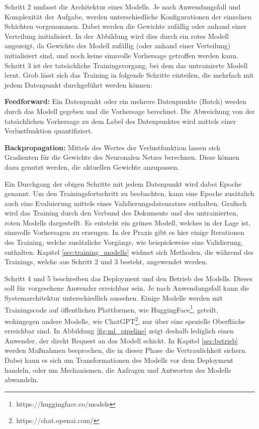 Schritt 2 umfasst die Architektur eines Modells.
Je nach Anwendungsfall und Komplexität der Aufgabe, werden unterschiedliche Konfigurationen der einzelnen Schichten vorgenommen.
Dabei werden die Gewichte zufällig oder anhand einer Verteilung initialisiert.
In der Abbildung wird dies durch ein rotes Modell angezeigt, da Gewichte des Modell zufällig (oder anhand einer Verteilung) initialisiert sind, und noch keine sinnvolle Vorhersage getroffen werden kann.
Schritt 3 ist der tatsächliche Trainingsvorgang, bei dem das untrainierte Modell lernt.
Grob lässt sich das Training in folgende Schritte einteilen, die mehrfach mit jedem Datenpunkt durchgeführt werden können:
\begin{compactenum}
\item \textbf{Feedforward: }Ein Datenpunkt oder ein mehrere Datenpunkte (Batch) werden durch das Modell gegeben und die Vorhersage berechnet. Die Abweichung von der tatsächlichen Vorhersage zu dem Label des Datenpunktes wird mittels einer Verlustfunktion quantifiziert.
\item \textbf{Backpropagation: }Mittels des Wertes der Verlustfunktion lassen sich Gradienten für die Gewichte des Neuronalen Netzes berechnen. Diese können dazu genutzt werden, die aktuellen Gewichte anzupassen. 
\end{compactenum}
Ein Durchgang der obigen Schritte mit jedem Datenpunkt wird dabei Epoche genannt. 
Um den Trainingsfortschritt zu beobachten, kann eine Epoche zusätzlich auch eine Evaluierung mittels eines Validierungsdatensatzes enthalten.
Grafisch wird das Training durch den Verbund des Dokuments und des untrainierten, roten Modells dargestellt. 
Es entsteht ein grünes Modell, welches in der Lage ist, sinnvolle Vorhersagen zu erzeugen.
In der Praxis gibt es hier einige Iterationen des Training, welche zusätzliche Vorgänge, wie beispielsweise eine Validierung, enthalten. 
Kapitel \ref{sec:training_modells} widmet sich Methoden, die während des Trainings, welche aus Schritt 2 und 3 besteht, angewendet werden.

Schritt 4 und 5 beschreiben das Deployment und den Betrieb des Modells. 
Dieses soll für vorgesehene Anwender erreichbar sein. 
Je nach Anwendungsfall kann die Systemarchitektur unterschiedlich aussehen. 
Einige Modelle werden mit Trainingscode auf öffentlichen Plattformen, wie HuggingFace\footnote{https://huggingface.co/models}, geteilt, wohingegen andere Modelle, wie ChatGPT\footnote{https://chat.openai.com/}, nur über eine spezielle Oberfläche erreichbar sind.
In Abbildung \ref{fig:ml_pipeline} zeigt deshalb lediglich einen Anwender, der direkt Request an das Modell schickt.
In Kapitel \ref{sec:betrieb} werden Maßnahmen besprochen, die in dieser Phase die Vertraulichkeit sichern. 
Dabei kann es sich um Transformationen des Modells vor dem Deployment handeln, oder um Mechanismen, die Anfragen und Antworten des Modells abwandeln.